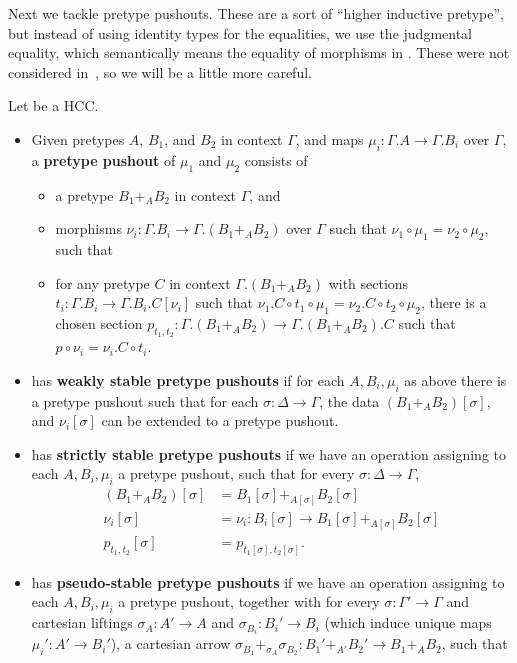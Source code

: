 \documentclass{amsart}
\begin{document}
Next we tackle pretype pushouts.
These are a sort of ``higher inductive pretype'', but instead of using identity types for the equalities, we use the judgmental equality, which semantically means the equality of morphisms in \E.
These were not considered in~\cite{lw:localuniv}, so we will be a little more careful.

\begin{definition}
  Let \E be a HCC.
  \begin{itemize}
  \item Given pretypes $A$, $B_1$, and $B_2$ in context $\Gamma$, and maps $\mu_i :\Gamma.A\to \Gamma.B_i$ over $\Gamma$, a \textbf{pretype pushout} of $\mu_1$ and $\mu_2$ consists of
    \begin{itemize}
    \item a pretype $B_1 +_A B_2$ in context $\Gamma$, and
    \item morphisms $\nu_i : \Gamma.B_i \to \Gamma.(B_1+_A B_2)$ over $\Gamma$ such that $\nu_1 \circ \mu_1 = \nu_2 \circ \mu_2$, such that
    \item for any pretype $C$ in context $\Gamma.(B_1 +_A B_2)$ with sections $t_i : \Gamma.B_i \to \Gamma.B_i.C[\nu_i]$ such that $\nu_1.C \circ t_1 \circ \mu_1 = \nu_2.C \circ t_2\circ \mu_2$, there is a chosen section $p_{t_1,t_2}:\Gamma.(B_1 +_A B_2) \to \Gamma.(B_1 +_A B_2).C$ such that $p \circ \nu_i = \nu_i.C \circ t_i$.
    \end{itemize}
  \item \E has \textbf{weakly stable pretype pushouts} if for each $A,B_i,\mu_i$ as above there is a pretype pushout such that for each $\sigma:\Delta\to\Gamma$, the data $(B_1 +_A B_2)[\sigma]$, and $\nu_i[\sigma]$ can be extended to a pretype pushout.
  \item \E has \textbf{strictly stable pretype pushouts} if we have an operation assigning to each $A,B_i,\mu_i$ a pretype pushout, such that for every $\sigma:\Delta\to\Gamma$,
    \begin{align*}
      (B_1 +_A B_2)[\sigma] &= B_1[\sigma] +_{A[\sigma]} B_2[\sigma]\\
      \nu_i[\sigma] &= \nu_i : B_i[\sigma] \to B_1[\sigma] +_{A[\sigma]} B_2[\sigma]\\
      p_{t_1,t_2}[\sigma] &= p_{t_1[\sigma],t_2[\sigma]}.
    \end{align*}
  \item \E has \textbf{pseudo-stable pretype pushouts} if we have an operation assigning to each $A,B_i,\mu_i$ a pretype pushout, together with for every $\sigma:\Gamma'\to\Gamma$ and cartesian liftings $\sigma_A:A'\to A$ and $\sigma_{B_i} : B_i' \to B_i$ (which induce unique maps $\mu_i' : A' \to B_i'$), a cartesian arrow $\sigma_{B_1} +_{\sigma_A} \sigma_{B_2} : B_1' +_{A'} B_2' \to B_1 +_A B_2$, such that

\end{itemize}
\end{definition}
\end{document}
